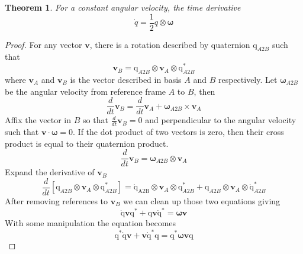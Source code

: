\documentclass{amsart}
\newtheorem{theorem}{Theorem}[section]
\theoremstyle{definition}
\theoremstyle{remark}
\numberwithin{equation}{section}
\begin{document}
\begin{theorem}
  For a constant angular velocity, the time derivative 
  \begin{equation}
    \dot{q} = \frac{1}{2} q \otimes \boldsymbol\omega
  \end{equation}
\end{theorem}
\begin{proof}
  For any vector $\mathbf{v}$, there is a rotation described by quaternion $\mathrm{q}_{A2B}$ such that
	\begin{equation}
		\mathbf{v}_B = \mathrm{q}_{A2B} \otimes \mathbf{v}_A \otimes \mathrm{q}^*_{A2B}
	\end{equation}
	where $\mathbf{v}_A$ and $\mathbf{v}_B$ is the vector described in basis $A$ and $B$ respectively.
	Let $\boldsymbol\omega_{A2B}$ be the angular velocity from reference frame $A$ to $B$, then 
  \begin{equation}
    \frac{d}{dt} {\mathbf{v}_B} = \frac{d}{dt} {\mathbf{v}_A} + \boldsymbol\omega_{A2B} \times {\mathbf{v}_A}
  \end{equation}
  Affix the vector in $B$ so that $\frac{d}{dt}\mathbf{v}_B=0$ and perpendicular to the angular velocity such that $\mathbf{v}\cdot \boldsymbol\omega=0$. If the dot product of two vectors is zero, then their cross product is equal to their quaternion product.
  \begin{equation}
    \frac{d}{dt} {\mathbf{v}_B} = \boldsymbol\omega_{A2B} \otimes {\mathbf{v}_A}
  \end{equation}
  Expand the derivative of $\mathbf{v}_B$
  \begin{equation}
    \frac{d}{dt} \left[\mathrm{q}_{A2B} \otimes \mathbf{v}_A \otimes \mathrm{q}^*_{A2B}\right]
    = \mathrm{\dot{q}_{A2B}}\otimes\mathbf{v}_A\otimes\mathrm{q}_{A2B}^* + \mathrm{q}_{A2B}\otimes\mathbf{v}_A\otimes \mathrm{\dot{q}}_{A2B}^*
  \end{equation}
  After removing references to $\mathbf{v}_B$ we can clean up those two equations giving
  \begin{equation}
    \mathrm{\dot{q}}\mathbf{v}\mathrm{q}^* +\mathrm{q}\mathbf{v}\mathrm{\dot{q}}^* = \boldsymbol\omega\mathbf{v}
  \end{equation}
  With some manipulation the equation becomes
  \begin{equation}
    \mathrm{q}^*\mathrm{\dot{q}}\mathbf{v}+\mathbf{v} \mathrm{\dot{q}}^*\mathrm{q} = \mathrm{q}^*\boldsymbol\omega \mathbf{v}\mathrm{q} \label{eqn:derivative_rearranged}
  \end{equation}

\end{proof}
\end{document}
